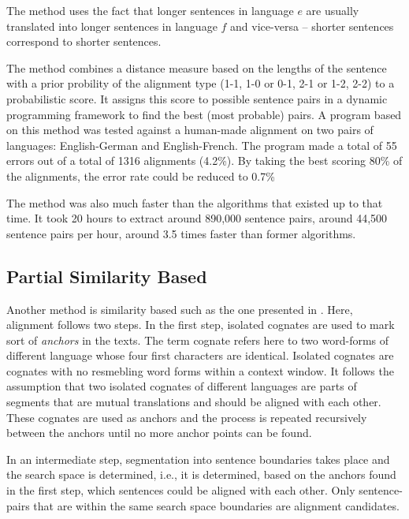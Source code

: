 
The method uses the fact that longer sentences in language \(e\) are usually translated into longer sentences in language \(f\) and vice-versa -- shorter sentences correspond to shorter sentences.

The method combines a distance measure based on the lengths of the sentence with a prior probility of the alignment type (1-1, 1-0 or 0-1, 2-1 or 1-2, 2-2) to a probabilistic score. 
It assigns this score to possible sentence pairs in a dynamic programming framework to find the best (most probable) pairs. 
A program based on this method was tested against a human-made alignment on two pairs of languages: English-German and English-French. 
The program made a total of 55 errors out of a total of 1316 alignments (4.2\%). 
By taking the best scoring 80\% of the alignments, the error rate could be reduced to 0.7\%

The method was also much faster than the algorithms that existed up to that time. 
It took 20 hours to extract around 890,000 sentence pairs, around 44,500 sentence pairs per hour, around 3.5 times faster than former algorithms.

\subsection{Partial Similarity Based}
Another method is similarity based such as the one presented in \cite{simard-plamondon-1996-bilingual}. 
Here, alignment follows two steps. 
In the first step, isolated cognates are used to mark sort of \emph{anchors} in the texts. 
The term cognate refers here to two word-forms of different language whose four first characters are identical. 
Isolated cognates are cognates with no resmebling word forms within a context window.
It follows the assumption that two isolated cognates of different languages are parts of segments that are mutual translations and should be aligned with each other. 
These cognates are used as anchors and the process is repeated recursively between the anchors until no more anchor points can be found.

In an intermediate step, segmentation into sentence boundaries takes place and the search space is determined, i.e., it is determined, based on the anchors found in the first step, which sentences could be aligned with each other. 
Only sentence-pairs that are within the same search space boundaries are alignment candidates.

